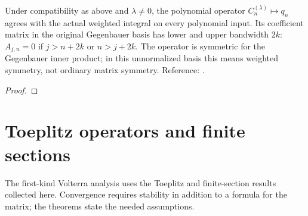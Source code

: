 \begin{theorem}
\label{thm:power-law-compatible-operator}
\leanok
Under compatibility as above and $\lambda\ne0$, the polynomial operator
$C_n^{(\lambda)}\mapsto q_n$ agrees with the actual weighted integral on every
polynomial input. Its coefficient matrix in the original Gegenbauer basis
has lower and upper bandwidth $2k$: $A_{j,n}=0$ if $j>n+2k$ or $n>j+2k$.
The operator is symmetric for the Gegenbauer inner product; in this
unnormalized basis this means weighted symmetry, not ordinary matrix symmetry.
Reference: \cite[Section 2]{gutleb-carrillo-olver}.
\end{theorem}
\begin{proof}
\leanok
\end{proof}













\chapter{Toeplitz operators and finite sections}\label{chap:toeplitz}
The first-kind Volterra analysis uses the Toeplitz and finite-section results
collected here. Convergence requires stability in addition to a formula for
the matrix; the theorems state the needed assumptions.

